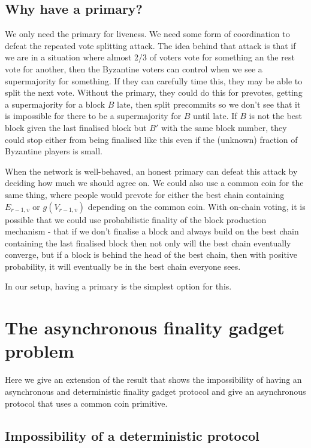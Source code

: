 \documentclass{article}
\begin{document}
{\subsection{Why have a primary?}

We only need the primary for liveness. We need some form of coordination to defeat the repeated vote splitting attack. The idea behind that attack is that if we are in a situation where almost 2/3 of voters vote for something an the rest vote for another, then the Byzantine voters can control when we see a supermajority for something. If they can carefully time this, they may be able to split the next vote. Without the primary, they could do this for prevotes, getting a supermajority for a block $B$ late, then split precommits so we don't see that it is impossible for there to be a supermajority for $B$ until late. If $B$ is not the best block given the last finalised block but $B'$  with the same block number, they could stop either from being finalised like this even if the (unknown) fraction of Byzantine players is small.

When the network is well-behaved, an honest primary can defeat this attack by deciding how much we should agree on. We could also use a common coin for the same thing, where people would prevote for either the best chain containing $E_{r-1,v}$ or $g(V_{r-1,v})$ depending on the common coin. With on-chain voting, it is possible that we could use probabilistic finality of the block production mechanism - that if we don't finalise a block and always build on the best chain containing the last finalised block then not only will the best chain eventually converge, but if a block is behind the head of the best chain, then with positive probability, it will eventually be in the best chain everyone sees.

In our setup, having a primary is the simplest option for this.

\section{The asynchronous finality gadget problem}

Here we give an extension of the \cite{flp} result that shows the impossibility of having an asynchronous and deterministic finality gadget protocol and give an asynchronous protocol that uses a common coin primitive.

\subsection{Impossibility of a deterministic protocol} \label{ssec:impossibility}

}
\end{document}
